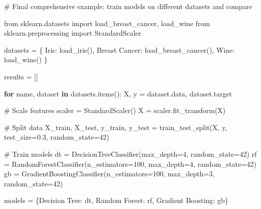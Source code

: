 \documentclass[
  letterpaper,
  DIV=11,
  numbers=noendperiod]{scrreprt}
\newenvironment{Shaded}{\begin{snugshade}}{\end{snugshade}}
\newcommand{\CommentTok}[1]{\textcolor[rgb]{0.37,0.37,0.37}{#1}}
\newcommand{\ControlFlowTok}[1]{\textcolor[rgb]{0.00,0.23,0.31}{\textbf{#1}}}
\newcommand{\DecValTok}[1]{\textcolor[rgb]{0.68,0.00,0.00}{#1}}
\newcommand{\FloatTok}[1]{\textcolor[rgb]{0.68,0.00,0.00}{#1}}
\newcommand{\ImportTok}[1]{\textcolor[rgb]{0.00,0.46,0.62}{#1}}
\newcommand{\KeywordTok}[1]{\textcolor[rgb]{0.00,0.23,0.31}{\textbf{#1}}}
\newcommand{\NormalTok}[1]{\textcolor[rgb]{0.00,0.23,0.31}{#1}}
\newcommand{\OperatorTok}[1]{\textcolor[rgb]{0.37,0.37,0.37}{#1}}
\newcommand{\StringTok}[1]{\textcolor[rgb]{0.13,0.47,0.30}{#1}}
\begin{document}
\begin{Shaded}
\begin{Highlighting}[]
\CommentTok{\# Final comprehensive example: train models on different datasets and compare}

\ImportTok{from}\NormalTok{ sklearn.datasets }\ImportTok{import}\NormalTok{ load\_breast\_cancer, load\_wine}
\ImportTok{from}\NormalTok{ sklearn.preprocessing }\ImportTok{import}\NormalTok{ StandardScaler}

\NormalTok{datasets }\OperatorTok{=}\NormalTok{ \{}
    \StringTok{\textquotesingle{}Iris\textquotesingle{}}\NormalTok{: load\_iris(),}
    \StringTok{\textquotesingle{}Breast Cancer\textquotesingle{}}\NormalTok{: load\_breast\_cancer(),}
    \StringTok{\textquotesingle{}Wine\textquotesingle{}}\NormalTok{: load\_wine()}
\NormalTok{\}}

\NormalTok{results }\OperatorTok{=}\NormalTok{ []}

\ControlFlowTok{for}\NormalTok{ name, dataset }\KeywordTok{in}\NormalTok{ datasets.items():}
\NormalTok{    X, y }\OperatorTok{=}\NormalTok{ dataset.data, dataset.target}
    
    \CommentTok{\# Scale features}
\NormalTok{    scaler }\OperatorTok{=}\NormalTok{ StandardScaler()}
\NormalTok{    X }\OperatorTok{=}\NormalTok{ scaler.fit\_transform(X)}
    
    \CommentTok{\# Split data}
\NormalTok{    X\_train, X\_test, y\_train, y\_test }\OperatorTok{=}\NormalTok{ train\_test\_split(X, y, test\_size}\OperatorTok{=}\FloatTok{0.3}\NormalTok{, random\_state}\OperatorTok{=}\DecValTok{42}\NormalTok{)}
    
    \CommentTok{\# Train models}
\NormalTok{    dt }\OperatorTok{=}\NormalTok{ DecisionTreeClassifier(max\_depth}\OperatorTok{=}\DecValTok{4}\NormalTok{, random\_state}\OperatorTok{=}\DecValTok{42}\NormalTok{)}
\NormalTok{    rf }\OperatorTok{=}\NormalTok{ RandomForestClassifier(n\_estimators}\OperatorTok{=}\DecValTok{100}\NormalTok{, max\_depth}\OperatorTok{=}\DecValTok{4}\NormalTok{, random\_state}\OperatorTok{=}\DecValTok{42}\NormalTok{)}
\NormalTok{    gb }\OperatorTok{=}\NormalTok{ GradientBoostingClassifier(n\_estimators}\OperatorTok{=}\DecValTok{100}\NormalTok{, max\_depth}\OperatorTok{=}\DecValTok{3}\NormalTok{, random\_state}\OperatorTok{=}\DecValTok{42}\NormalTok{)}
    
\NormalTok{    models }\OperatorTok{=}\NormalTok{ \{}\StringTok{\textquotesingle{}Decision Tree\textquotesingle{}}\NormalTok{: dt, }\StringTok{\textquotesingle{}Random Forest\textquotesingle{}}\NormalTok{: rf, }\StringTok{\textquotesingle{}Gradient Boosting\textquotesingle{}}\NormalTok{: gb\}}
    

\end{Highlighting}
\end{Shaded}
\end{document}
